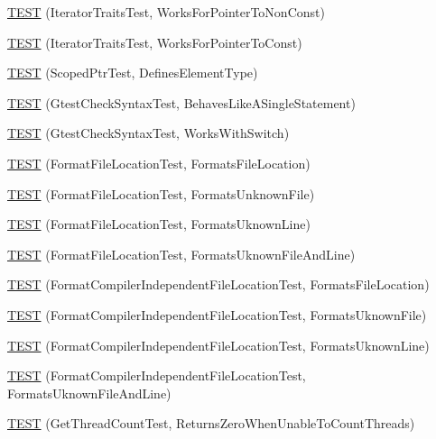 \begin{DoxyCompactItemize}
\hyperlink{namespacetesting_1_1internal_a642234d85836450bb8795cf0a8a9f908}{T\+E\+ST} (Iterator\+Traits\+Test, Works\+For\+Pointer\+To\+Non\+Const)
\item 
\hyperlink{namespacetesting_1_1internal_afc0e95a0472d243967fd4720c681c478}{T\+E\+ST} (Iterator\+Traits\+Test, Works\+For\+Pointer\+To\+Const)
\item 
\hyperlink{namespacetesting_1_1internal_a99f56e2e9d5b30a879f877cc72bb0c0c}{T\+E\+ST} (Scoped\+Ptr\+Test, Defines\+Element\+Type)
\item 
\hyperlink{namespacetesting_1_1internal_a26d00130a017a66d0d60dc5a02a13d25}{T\+E\+ST} (Gtest\+Check\+Syntax\+Test, Behaves\+Like\+A\+Single\+Statement)
\item 
\hyperlink{namespacetesting_1_1internal_a4dfd147ff396984fca799878cb53dcea}{T\+E\+ST} (Gtest\+Check\+Syntax\+Test, Works\+With\+Switch)
\item 
\hyperlink{namespacetesting_1_1internal_a1a1c20d78e9e75b9c7f2b767eb62611b}{T\+E\+ST} (Format\+File\+Location\+Test, Formats\+File\+Location)
\item 
\hyperlink{namespacetesting_1_1internal_ace2f5407afdfb0767035d44b6758e4a0}{T\+E\+ST} (Format\+File\+Location\+Test, Formats\+Unknown\+File)
\item 
\hyperlink{namespacetesting_1_1internal_a17d1f472b6c1154de7b5b008b964ee32}{T\+E\+ST} (Format\+File\+Location\+Test, Formats\+Uknown\+Line)
\item 
\hyperlink{namespacetesting_1_1internal_a1195aaf7258c5442de7aebd95acefb9f}{T\+E\+ST} (Format\+File\+Location\+Test, Formats\+Uknown\+File\+And\+Line)
\item 
\hyperlink{namespacetesting_1_1internal_a9c12f8c1ebb19906e8fa0c430d139076}{T\+E\+ST} (Format\+Compiler\+Independent\+File\+Location\+Test, Formats\+File\+Location)
\item 
\hyperlink{namespacetesting_1_1internal_a65ad1cad17717c1b8ac4c2d4bef5e079}{T\+E\+ST} (Format\+Compiler\+Independent\+File\+Location\+Test, Formats\+Uknown\+File)
\item 
\hyperlink{namespacetesting_1_1internal_a0315a64a661f249628f2884080e0614f}{T\+E\+ST} (Format\+Compiler\+Independent\+File\+Location\+Test, Formats\+Uknown\+Line)
\item 
\hyperlink{namespacetesting_1_1internal_a8b9aee556f3dec6e67c35830ba55e0bd}{T\+E\+ST} (Format\+Compiler\+Independent\+File\+Location\+Test, Formats\+Uknown\+File\+And\+Line)
\item 
\hyperlink{namespacetesting_1_1internal_a5ad8299ae9325382f01b945f4f81711e}{T\+E\+ST} (Get\+Thread\+Count\+Test, Returns\+Zero\+When\+Unable\+To\+Count\+Threads)

\end{DoxyCompactItemize}
